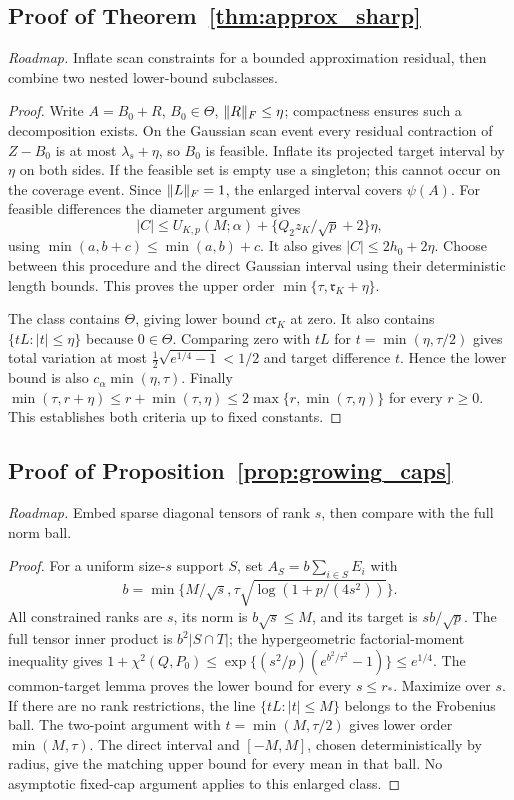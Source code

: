 \subsection{Proof of Theorem~\ref{thm:approx_sharp}}
\noindent\emph{Roadmap.} Inflate scan constraints for a bounded approximation residual, then combine two nested lower-bound subclasses.
\begin{proof}
Write $A=B_0+R$, $B_0\in\Theta$, $\lVert R\rVert_F\le\eta$; compactness ensures such a decomposition exists. On the Gaussian scan event every residual contraction of $Z-B_0$ is at most $\lambda_s+\eta$, so $B_0$ is feasible. Inflate its projected target interval by $\eta$ on both sides. If the feasible set is empty use a singleton; this cannot occur on the coverage event. Since $\lVert L\rVert_F=1$, the enlarged interval covers $\psi(A)$.
For feasible differences the diameter argument gives
\[
 |C|\le U_{K,p}(M;\alpha)
       +\{Q_2z_K/\sqrt p+2\}\eta,
\]
using $\min(a,b+c)\le\min(a,b)+c$. It also gives $|C|\le2h_0+2\eta$.
Choose between this procedure and the direct Gaussian interval using their deterministic length bounds. This proves the upper order
$\min\{\tau,\mathfrak r_K+\eta\}$.

The class contains $\Theta$, giving lower bound $c\mathfrak r_K$ at zero. It also contains $\{tL:|t|\le\eta\}$ because $0\in\Theta$. Comparing zero with $tL$ for $t=\min(\eta,\tau/2)$ gives total variation at most
$\tfrac12\sqrt{e^{1/4}-1}<1/2$ and target difference $t$. Hence the lower bound is also $c_\alpha\min(\eta,\tau)$. Finally
$\min(\tau,r+\eta)\le r+\min(\tau,\eta)\le2\max\{r,\min(\tau,\eta)\}$
for every $r\ge0$. This establishes both criteria up to fixed constants.
\end{proof}

\subsection{Proof of Proposition~\ref{prop:growing_caps}}
\noindent\emph{Roadmap.} Embed sparse diagonal tensors of rank $s$, then compare with the full norm ball.
\begin{proof}
For a uniform size-$s$ support $S$, set
$A_S=b\sum_{i\in S}E_i$ with
\[
 b=\min\{M/\sqrt s,\tau\sqrt{\log(1+p/(4s^2))}\}.
\]
All constrained ranks are $s$, its norm is $b\sqrt s\le M$, and its target is $sb/\sqrt p$. The full tensor inner product is $b^2|S\cap T|$; the hypergeometric factorial-moment inequality gives
$1+\chi^2(Q,P_0)\le\exp\{(s^2/p)(e^{b^2/\tau^2}-1)\}\le e^{1/4}$.
The common-target lemma proves the lower bound for every $s\le r_*$. Maximize over $s$.
If there are no rank restrictions, the line $\{tL:|t|\le M\}$ belongs to the Frobenius ball. The two-point argument with $t=\min(M,\tau/2)$ gives lower order $\min(M,\tau)$. The direct interval and $[-M,M]$, chosen deterministically by radius, give the matching upper bound for every mean in that ball. No asymptotic fixed-cap argument applies to this enlarged class.
\end{proof}

